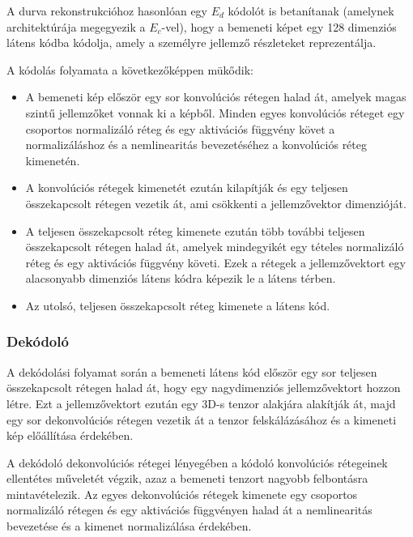 \documentclass[12pt,a4]{article}
\begin{document}
                A durva rekonstrukcióhoz hasonlóan egy $E_{d}$ kódolót is betanítanak (amelynek architektúrája megegyezik a $E_{c}$-vel), hogy a bemeneti képet egy 128 dimenziós látens kódba kódolja, amely a személyre jellemző részleteket reprezentálja. 
    
    
                A kódolás folyamata a következőképpen mükődik:
                \begin{itemize}
    	           \item A bemeneti kép először egy sor konvolúciós rétegen halad át, amelyek magas szintű jellemzőket vonnak ki a képből. Minden egyes konvolúciós réteget egy csoportos normalizáló réteg és egy aktivációs függvény követ a normalizáláshoz és a nemlinearitás bevezetéséhez a konvolúciós réteg kimenetén.
                
    	           \item A konvolúciós rétegek kimenetét ezután kilapítják és egy teljesen összekapcsolt rétegen vezetik át, ami csökkenti a jellemzővektor dimenzióját.
                
    	           \item A teljesen összekapcsolt réteg kimenete ezután több további teljesen összekapcsolt rétegen halad át, amelyek mindegyikét egy tételes normalizáló réteg és egy aktivációs függvény követi. Ezek a rétegek a jellemzővektort egy alacsonyabb dimenziós látens kódra képezik le a látens térben.
                
    	           \item Az utolsó, teljesen összekapcsolt réteg kimenete a látens kód.
    	           
                \end{itemize}
    
            \subsubsection{Dekódoló} \label{Dekódoló}
    
                A dekódolási folyamat során a bemeneti látens kód először egy sor teljesen összekapcsolt rétegen halad át, hogy egy nagydimenziós jellemzővektort hozzon létre. Ezt a jellemzővektort ezután egy 3D-s tenzor alakjára alakítják át, majd egy sor dekonvolúciós rétegen vezetik át a tenzor felskálázásához és a kimeneti kép előállítása érdekében.
    
                A dekódoló dekonvolúciós rétegei lényegében a kódoló konvolúciós rétegeinek ellentétes műveletét végzik, azaz a bemeneti tenzort nagyobb felbontásra mintavételezik. Az egyes dekonvolúciós rétegek kimenete egy csoportos normalizáló rétegen és egy aktivációs függvényen halad át a nemlinearitás bevezetése és a kimenet normalizálása érdekében.
    
\end{document}
